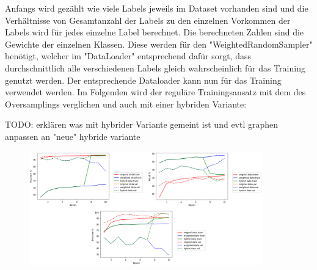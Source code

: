 \documentclass[11pt, a4paper]{article}
\begin{document}
Anfangs wird gezählt wie viele Labels jeweils im Dataset vorhanden sind und die Verhältnisse von Gesamtanzahl der Labels zu den einzelnen Vorkommen der Labels wird für jedes einzelne Label berechnet. Die berechneten Zahlen sind die Gewichte der einzelnen Klassen. Diese werden für den "WeightedRandomSampler" benötigt, welcher im "DataLoader" entsprechend dafür sorgt, dass durchschnittlich alle verschiedenen Labels gleich wahrscheinlich für das Training genutzt werden. Der entsprechende Dataloader kann nun für das Training verwendet werden. Im Folgenden wird der reguläre Trainingsansatz mit dem des Oversamplings verglichen und auch mit einer hybriden Variante:

TODO: erklären was mit hybrider Variante gemeint ist und evtl graphen anpassen an "neue" hybride variante

\begin{figure}[h]
\centering
\includegraphics[width=0.9\textwidth]{metrics-acc-recall-prec.png}
\end{figure}
\end{document}
